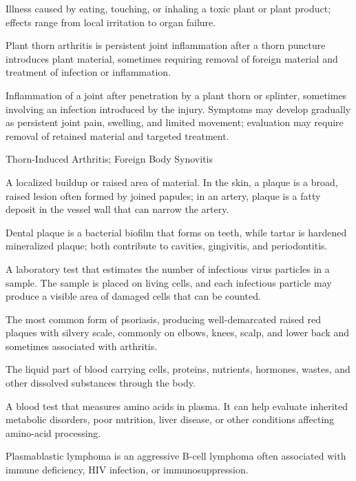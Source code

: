  Illness caused by eating, touching, or inhaling a toxic plant or plant product; effects range from local irritation to organ failure.

 Plant thorn arthritis is persistent joint inflammation after a thorn puncture introduces plant material, sometimes requiring removal of foreign material and treatment of infection or inflammation.

 Inflammation of a joint after penetration by a plant thorn or splinter, sometimes involving an infection introduced by
the injury. Symptoms may develop gradually as persistent joint pain, swelling, and
limited movement; evaluation may require removal of retained material and targeted
treatment.

\synonyms
Thorn-Induced Arthritis; Foreign Body Synovitis

 A localized buildup or raised area of material. In the skin, a plaque is a broad, raised lesion often formed by joined papules; in an artery, plaque is a fatty deposit in the vessel wall that can narrow the artery.

 Dental plaque is a bacterial biofilm that forms on teeth, while tartar is hardened mineralized plaque; both contribute to cavities, gingivitis, and periodontitis.

 A laboratory test that estimates the number of infectious virus particles in a sample. The sample is placed on living cells, and each infectious particle may produce a visible area of damaged cells that can be counted.

 The most common form of psoriasis, producing well-demarcated raised red plaques with silvery scale, commonly on elbows, knees, scalp, and lower back and sometimes associated with arthritis.

 The liquid part of blood carrying cells, proteins, nutrients, hormones, wastes, and other dissolved substances through the body.

 A blood test that measures amino acids in plasma. It can help evaluate inherited metabolic disorders, poor nutrition, liver disease, or other conditions affecting amino-acid processing.

 Plasmablastic lymphoma is an aggressive B-cell lymphoma often associated with immune deficiency, HIV infection, or immunosuppression.

